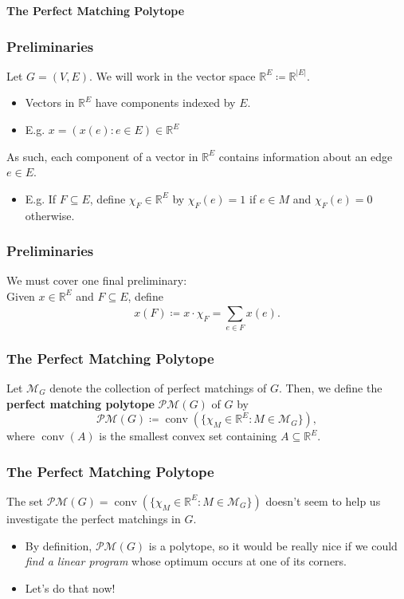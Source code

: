 
\begin{frame}
\begin{center}
\Large \textbf{The Perfect Matching Polytope} 
\end{center}
\end{frame}

\begin{frame}
\frametitle{Preliminaries}
Let \( G = (V,E) \). We will work in the vector space \( \mathbb{R}^{E} \coloneqq \mathbb{R}^{|E|}  \).
\begin{itemize}
	\item Vectors in \( \mathbb{R}^{E}  \) have components indexed by \( E \).
	\item E.g. \( x = (x(e) : e \in E) \in \mathbb{R}^{E} \)
\end{itemize}
\vspace{0.3cm}
As such, each component of a vector in \( \mathbb{R}^{E}  \) contains information about an edge \( e \in E \).
\begin{itemize}
	\item E.g. If \( F \subseteq E \), define \( \chi_{F} \in \mathbb{R}^{E}  \) by \( \chi_{F}(e) = 1  \) if \( e \in M \) and \( \chi_{F} (e) = 0 \) otherwise.
\end{itemize}
\vspace{0.3cm}
\end{frame}

\begin{frame}
\frametitle{Preliminaries}
We must cover one final preliminary: \\
\vspace{0.3cm}
Given \( x \in \mathbb{R}^{E}  \) and \( F \subseteq E \), define \[ x(F) \coloneqq x \cdot \chi_{F} = \sum_{e \in F}^{} x(e) .  \]
\end{frame}

\begin{frame}
\frametitle{The Perfect Matching Polytope}
Let \( \mathcal{M}_{G}  \) denote the collection of perfect matchings of \( G \). Then, we define the \textbf{perfect matching polytope} \( \mathcal{P} \mathcal{M}  (G) \) of \( G \) by \[ \mathcal{P} \mathcal{M} (G) \coloneqq \operatorname{conv} (\{ \chi_{M} \in \mathbb{R}^{E} : M \in \mathcal{M} _{G}  \} ), \] where \( \operatorname{conv} (A) \) is the smallest convex set containing \( A \subseteq \mathbb{R}^{E}  \).
\end{frame}

\begin{frame}
\frametitle{The Perfect Matching Polytope}
The set \( \mathcal{P} \mathcal{M} (G) = \operatorname{conv} (\{ \chi_{M} \in \mathbb{R}^{E} : M \in \mathcal{M} _{G}  \} ) \) doesn't seem to help us investigate the perfect matchings in \( G \).
\begin{itemize}
	\item<2-> By definition, \( \mathcal{P} \mathcal{M} (G) \) is a polytope, so it would be really nice if we could \emph{find a linear program} whose optimum occurs at one of its corners. 
	\item<3> Let's do that now!
\end{itemize}
\end{frame}

